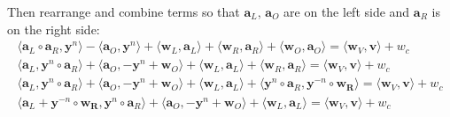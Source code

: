 \documentclass[../lecture-notes-148x210.tex]{subfiles}
\begin{document}
Then rearrange and combine terms so that $\mathbf{a}_L$, $\mathbf{a}_O$ are on the left side and $\mathbf{a}_R$ is on the right side:
\begin{equation*}
    \begin{aligned}
        \langle \mathbf{a}_L \circ \mathbf{a}_R, \mathbf{y}^n \rangle - \langle \mathbf{a}_O, \mathbf{y}^n \rangle + \langle \mathbf{w}_L, \mathbf{a}_L \rangle + \langle \mathbf{w}_R, \mathbf{a}_R \rangle + \langle \mathbf{w}_O, \mathbf{a}_O \rangle = \langle \mathbf{w}_V, \mathbf{v} \rangle + w_c \\
        \langle \mathbf{a}_L, \mathbf{y}^n \circ \mathbf{a}_R \rangle + \langle \mathbf{a}_O, - \mathbf{y}^n + \mathbf{w}_O \rangle + \langle \mathbf{w}_L, \mathbf{a}_L \rangle + \langle \mathbf{w}_R, \mathbf{a}_R \rangle = \langle \mathbf{w}_V, \mathbf{v} \rangle + w_c \\
        \langle \mathbf{a}_L, \mathbf{y}^n \circ \mathbf{a}_R \rangle + \langle \mathbf{a}_O, - \mathbf{y}^n + \mathbf{w}_O \rangle + \langle \mathbf{w}_L, \mathbf{a}_L \rangle + \langle \mathbf{y}^n \circ \mathbf{a}_R, \mathbf{y}^{-n} \circ \mathbf{w_R} \rangle = \langle \mathbf{w}_V, \mathbf{v} \rangle + w_c \\
        \langle \mathbf{a}_L + \mathbf{y}^{-n} \circ \mathbf{w_R}, \mathbf{y}^n \circ \mathbf{a}_R \rangle + \langle \mathbf{a}_O, - \mathbf{y}^n + \mathbf{w}_O \rangle + \langle \mathbf{w}_L, \mathbf{a}_L \rangle = \langle \mathbf{w}_V, \mathbf{v} \rangle + w_c \\
    \end{aligned}
\end{equation*}
\end{document}
